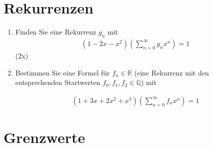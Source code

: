 \documentclass{article}
\begin{document}
\section*{Rekurrenzen}

\begin{enumerate}
    \item Finden Sie eine Rekurrenz $g_n$ mit \begin{align*}
        (1 - 2x - x^2)\left(\sum_{n=0}^{\infty}g_nx^n\right) = 1
    \end{align*} (2x)

    \item Bestimmen Sie eine Formel für $f_n \in \mathbb{R}$ (eine Rekurrenz mit den entsprechenden Startwerten $f_0, f_1, f_2 \in \mathbb{Q}$) mit

    \begin{align*}
        (1 + 3x + 2x^2 + x^3)\left(\sum_{n = 0}^{\infty}f_nx^n\right) = 1
    \end{align*}
\end{enumerate}

\section*{Grenzwerte}
\end{document}
